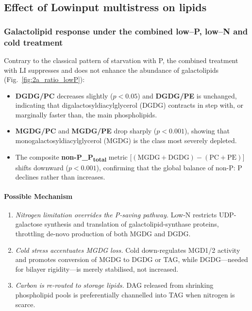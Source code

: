 \documentclass[10pt,letterpaper]{article}
\begin{document}
\subsection*{Effect of Lowinput multistress on lipids}

\subsubsection*{Galactolipid response under the combined low–P, low–N and cold treatment}

Contrary to the classical pattern of starvation with P, the combined treatment with LI suppresses and does not enhance the abundance of galactolipids (Fig.~\ref{fig:2a_ratio_lowP}):

\begin{itemize}
  \item \textbf{DGDG/PC} decreases slightly ($p<0.05$) and
        \textbf{DGDG/PE} is unchanged, indicating that digalactosyldiacylglycerol (DGDG) contracts in step with, or marginally faster than, the main phospholipids.
  \item \textbf{MGDG/PC} and \textbf{MGDG/PE} drop sharply
        ($p<0.001$), showing that
        monogalactosyldiacylglycerol (MGDG) is the class most severely depleted.
  \item The composite \textbf{ non-P_P\textsubscript{total}} metric
        \(\bigl[(\mathrm{MGDG}+\mathrm{DGDG})-(\mathrm{PC}+\mathrm{PE})\bigr]\)
        shifts downward ($p<0.001$), confirming that the global
balance of non-P: P declines rather than increases.
\end{itemize}

\paragraph{Possible Mechanism}
\begin{enumerate}
  \item \textit{Nitrogen limitation overrides the P-saving pathway.}  
        Low-N restricts UDP-galactose synthesis and translation of
        galactolipid-synthase proteins, throttling de-novo production of both
        MGDG and DGDG.
  \item \textit{Cold stress accentuates MGDG loss.}  
        Cold down-regulates MGD1/2 activity and promotes conversion of MGDG to
        DGDG or TAG, while DGDG—needed for bilayer rigidity—is merely
        stabilised, not increased.
  \item \textit{Carbon is re-routed to storage lipids.}  
        DAG released from shrinking phospholipid pools is preferentially
        channelled into TAG when nitrogen is scarce.
\end{enumerate}
\end{document}

